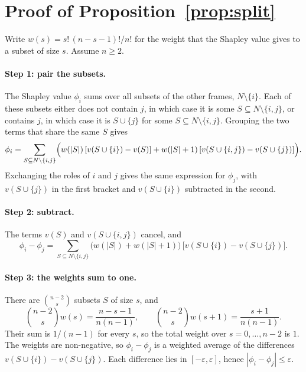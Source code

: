 
\section{Proof of Proposition~\ref{prop:split}}
\label{app:proofs}


Write $w(s) = s!\,(n - s - 1)!/n!$ for the weight that the Shapley value gives to a subset of size $s$.
Assume $n \ge 2$.

\paragraph{Step 1: pair the subsets.}
The Shapley value $\phi_i$ sums over all subsets of the other frames, $N \setminus \{i\}$.
Each of these subsets either does not contain $j$, in which case it is some $S \subseteq N \setminus \{i, j\}$, or contains $j$, in which case it is $S \cup \{j\}$ for some $S \subseteq N \setminus \{i, j\}$.
Grouping the two terms that share the same $S$ gives
\begin{equation*}
  \phi_i = \sum_{S \subseteq N \setminus \{i, j\}}
  \Bigl( w(|S|)\,[v(S \cup \{i\}) - v(S)] + w(|S| + 1)\,[v(S \cup \{i, j\}) - v(S \cup \{j\})] \Bigr).
\end{equation*}
Exchanging the roles of $i$ and $j$ gives the same expression for $\phi_j$, with $v(S \cup \{j\})$ in the first bracket and $v(S \cup \{i\})$ subtracted in the second.

\paragraph{Step 2: subtract.}
The terms $v(S)$ and $v(S \cup \{i, j\})$ cancel, and
\begin{equation*}
  \phi_i - \phi_j = \sum_{S \subseteq N \setminus \{i, j\}} \bigl( w(|S|) + w(|S| + 1) \bigr)\,
  \bigl[ v(S \cup \{i\}) - v(S \cup \{j\}) \bigr].
\end{equation*}

\paragraph{Step 3: the weights sum to one.}
There are $\binom{n-2}{s}$ subsets $S$ of size $s$, and
\begin{equation*}
  \binom{n-2}{s} w(s) = \frac{n - s - 1}{n(n-1)}, \qquad
  \binom{n-2}{s} w(s + 1) = \frac{s + 1}{n(n-1)} .
\end{equation*}
Their sum is $1/(n-1)$ for every $s$, so the total weight over $s = 0, \dots, n-2$ is $1$.
The weights are non-negative, so $\phi_i - \phi_j$ is a weighted average of the differences $v(S \cup \{i\}) - v(S \cup \{j\})$.
Each difference lies in $[-\varepsilon, \varepsilon]$, hence $|\phi_i - \phi_j| \le \varepsilon$.

